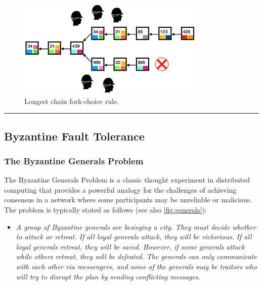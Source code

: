 \begin{figure}[t]
	\begin{center}
		\includegraphics[width=0.8\textwidth]{./figs/longest-chain.png} 
		\caption{Longest chain fork-choice rule.}		
		\label{fig:longest-chain}
	\end{center}	
\end{figure}

\begin{center}\rule{0.5\linewidth}{0.5pt}\end{center}

\subsection{Byzantine Fault
	Tolerance}\label{section-3-byzantine-fault-tolerance}

\subsubsection{The Byzantine Generals
	Problem}\label{the-byzantine-generals-problem}

The Byzantine Generals Problem is a classic thought experiment in
distributed computing that provides a powerful analogy for the
challenges of achieving consensus in a network where some participants
may be unreliable or malicious. The problem is typically stated as
follows (see also \autoref{fig:generals}):

\begin{itemize}
	\item \textit{A group of Byzantine generals are besieging a city. They must decide whether to attack or retreat. If all loyal generals attack, they
		will be victorious. If all loyal generals retreat, they will be saved.
		However, if some generals attack while others retreat, they will be
		defeated. The generals can only communicate with each other via
		messengers, and some of the generals may be traitors who will try to
		disrupt the plan by sending conflicting messages.}
	
\end{itemize}

